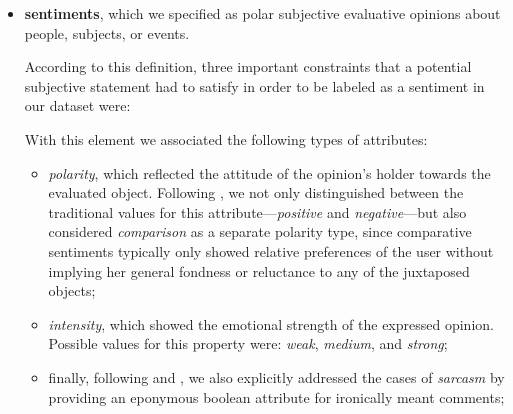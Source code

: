 \begin{itemize}
\item
  \textbf{sentiments}, which we specified as polar subjective
  evaluative opinions about people, subjects, or events.

  According to this definition, three important constraints that a
  potential subjective statement had to satisfy in order to be labeled
  as a sentiment in our dataset were:

  With this element we associated the following types of attributes:
  \begin{itemize}
  \item \emph{polarity}, which reflected the attitude of the opinion's
    holder towards the evaluated object.  Following
    \citet{Jindal:06a,Jindal:06b}, we not only distinguished between
    the traditional values for this attribute---\emph{positive} and
    \emph{negative}---but also considered \emph{comparison} as a
    separate polarity type, since comparative sentiments typically
    only showed relative preferences of the user without implying her
    general fondness or reluctance to any of the juxtaposed objects;
  \item \emph{intensity}, which showed the emotional strength of the
    expressed opinion.  Possible values for this property were:
    \emph{weak}, \emph{medium}, and \emph{strong};
  \item finally, following \citet{Bosco:13} and \citet{Rosenthal:14},
    we also explicitly addressed the cases of \emph{sarcasm} by
    providing an eponymous boolean attribute for ironically meant
    comments;
  \end{itemize}


\end{itemize}
